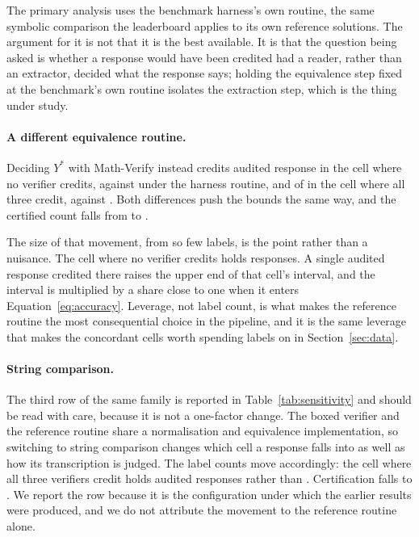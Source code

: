 The primary analysis uses the benchmark harness's own routine, the same symbolic comparison
the leaderboard applies to its own reference solutions. The argument for it is not that it is
the best available. It is that the question being asked is whether a response would have been
credited had a reader, rather than an extractor, decided what the response says; holding the
equivalence step fixed at the benchmark's own routine isolates the extraction step, which is
the thing under study.

\paragraph{A different equivalence routine.}
Deciding $Y^*$ with Math-Verify instead credits \SensMvCorrectRejectAll{} audited response in
the cell where no verifier credits, against \AuditCorrectRejectAll{} under the harness routine,
and \SensMvCorrectAgreeAll{} of \AuditNAgreeAll{} in the cell where all three credit, against
\AuditCorrectAgreeAll{}. Both differences push the bounds the same way, and the certified
count falls from \CertEpsZero{} to \SensMvCombined{}.

The size of that movement, from so few labels, is the point rather than a nuisance. The cell
where no verifier credits holds \CellRejectAll{} responses. A single audited response credited
there raises the upper end of that cell's interval, and the interval is multiplied by a share
close to one when it enters Equation~\eqref{eq:accuracy}. Leverage, not label count, is what
makes the reference routine the most consequential choice in the pipeline, and it is the same
leverage that makes the concordant cells worth spending labels on in
Section~\ref{sec:data}.

\paragraph{String comparison.}
The third row of the same family is reported in Table~\ref{tab:sensitivity} and should be read
with care, because it is not a one-factor change. The boxed verifier and the reference routine
share a normalisation and equivalence implementation, so switching to string comparison
changes which cell a response falls into as well as how its transcription is judged. The
label counts move accordingly: the cell where all three verifiers credit holds
\SensStringNAgreeAll{} audited responses rather than \AuditNAgreeAll{}. Certification falls to
\SensStringCombined{}. We report the row because it is the configuration under which the
earlier results were produced, and we do not attribute the movement to the reference routine
alone.

